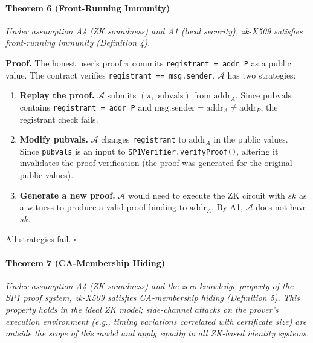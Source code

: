 \documentclass[11pt, a4paper]{article}
\begin{document}
\paragraph{Theorem 6 (Front-Running
Immunity)}\label{theorem-6-front-running-immunity}

\emph{Under assumption A4 (ZK soundness) and A1 (local security),
zk-X509 satisfies front-running immunity (Definition 4).}

\textbf{Proof.} The honest user's proof \(\pi\) commits
\texttt{registrant\ =\ addr\_P} as a public value. The contract verifies
\texttt{registrant\ ==\ msg.sender}. \(\mathcal{A}\) has two strategies:

\begin{enumerate}
\def\labelenumi{(\alph{enumi})}
\item
  \textbf{Replay the proof.} \(\mathcal{A}\) submits
  \((\pi, \text{pubvals})\) from \(\text{addr}_A\). Since
  \(\text{pubvals}\) contains \texttt{registrant\ =\ addr\_P} and
  \(\text{msg.sender} = \text{addr}_A \neq \text{addr}_P\), the
  registrant check fails.
\item
  \textbf{Modify pubvals.} \(\mathcal{A}\) changes \texttt{registrant}
  to \(\text{addr}_A\) in the public values. Since \texttt{pubvals} is
  an input to \texttt{SP1Verifier.verifyProof()}, altering it
  invalidates the proof verification (the proof was generated for the
  original public values).
\item
  \textbf{Generate a new proof.} \(\mathcal{A}\) would need to execute
  the ZK circuit with \(sk\) as a witness to produce a valid proof
  binding to \(\text{addr}_A\). By A1, \(\mathcal{A}\) does not have
  \(sk\).
\end{enumerate}

All strategies fail. \(\square\)

\paragraph{Theorem 7 (CA-Membership
Hiding)}\label{theorem-5-ca-membership-hiding}

\emph{Under assumption A4 (ZK soundness) and the zero-knowledge property
of the SP1 proof system, zk-X509 satisfies CA-membership hiding
(Definition 5). This property holds in the ideal ZK model; side-channel
attacks on the prover's execution environment (e.g., timing variations
correlated with certificate size) are outside the scope of this model
and apply equally to all ZK-based identity systems.}
\end{document}
